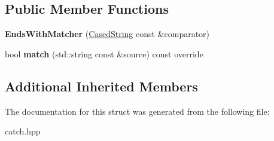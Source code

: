 \subsection*{Public Member Functions}
\begin{DoxyCompactItemize}
\item 
{\bfseries Ends\+With\+Matcher} (\hyperlink{structCatch_1_1Matchers_1_1StdString_1_1CasedString}{Cased\+String} const \&comparator)\hypertarget{structCatch_1_1Matchers_1_1StdString_1_1EndsWithMatcher_aa5ec700b4629562f74f362080accfd7b}{}\label{structCatch_1_1Matchers_1_1StdString_1_1EndsWithMatcher_aa5ec700b4629562f74f362080accfd7b}

\item 
bool {\bfseries match} (std\+::string const \&source) const override\hypertarget{structCatch_1_1Matchers_1_1StdString_1_1EndsWithMatcher_aca2741fa57374a2a98d2a84ac3e13a6d}{}\label{structCatch_1_1Matchers_1_1StdString_1_1EndsWithMatcher_aca2741fa57374a2a98d2a84ac3e13a6d}

\end{DoxyCompactItemize}
\subsection*{Additional Inherited Members}


The documentation for this struct was generated from the following file\+:\begin{DoxyCompactItemize}
\item 
catch.\+hpp\end{DoxyCompactItemize}
